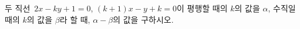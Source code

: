 두 직선~$2x-ky+1=0$, $(k+1)x-y+k=0$이 평행할 때의 $k$의 값을 $\alpha$, 수직일 때의 $k$의 값을 $\beta$라 할 때, $\alpha-\beta$의 값을 구하시오. 
